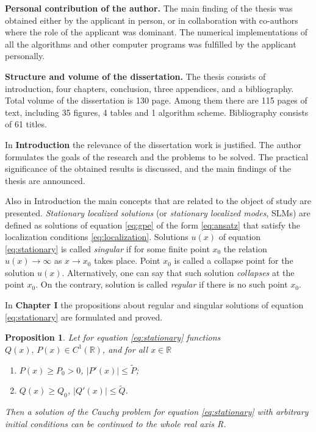 \documentclass[candidate, href, colorlinks]{disser}
\newtheorem{proposition}{Proposition}
\begin{document}
\textbf{Personal contribution of the author.}
The main finding of the thesis was obtained either by the applicant in person, or in collaboration with co-authors where the role of the applicant was dominant.
The numerical implementations of all the algorithms and other computer programs was fulfilled by the applicant personally.

\textbf{Structure and volume of the dissertation.}
The thesis consists of introduction, four chapters, conclusion, three appendices, and a bibliography.
Total volume of the dissertation is 130 page.
Among them there are 115 pages of text, including 35 figures, 4 tables and 1 algorithm scheme.
Bibliography consists of 61 titles.


In \textbf{Introduction} the relevance of the dissertation work is justified.
The author formulates the goals of the research and the problems to be solved.
The practical significance of the obtained results is discussed, and the main findings of the thesis are announced.

Also in Introduction the main concepts that are related to the object of study are presented.
{\it Stationary localized solutions} (or {\it stationary localized modes}, SLMs) are defined as solutions of equation \eqref{eq:gpe} of the form \eqref{eq:ansatz} that satisfy the localization conditions \eqref{eq:localization}.
Solutions $u(x)$ of equation \eqref{eq:stationary} is called  {\it singular} if for some finite point $x_0$ the relation $u(x) \to \infty$ as $x \to x_0$ takes place.
Point $x_0$ is called a collapse point for the solution $u(x)$.
Alternatively, one can say that such solution {\it collapses} at the point $x_0$.
On the contrary, solution is called {\it regular} if there is no such point $x_0$.

In \textbf{Chapter I} the propositions about regular and singular solutions of equation \eqref{eq:stationary} are formulated and proved.

\begin{proposition}
\label{prop:absense-of-singular-solutions}
	Let for equation \eqref{eq:stationary} functions $Q(x), \, P(x) \in C^1(\mathbb{R})$, and for all $x \in \mathbb{R}$
	\begin{enumerate}
		\item[(a)] $P(x) \ge P_0 > 0$, $|P'(x)| \le \widetilde{P}$;
		\item[(b)] $Q(x) \ge Q_0$, $|Q'(x)| \le \widetilde{Q}$.
	\end{enumerate}
	Then a solution of the Cauchy problem for equation \eqref{eq:stationary} with arbitrary initial condi­tions can be continued to the whole real axis R.
\end{proposition}
\end{document}
